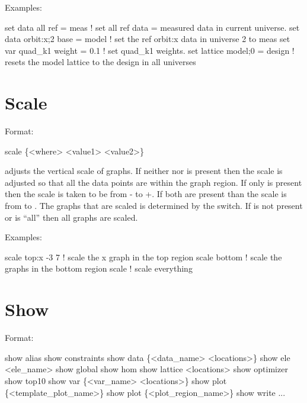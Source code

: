 Examples:
\begin{example}
  set data all ref = meas         ! set all ref data = measured data in current universe.
  set data orbit:x;2 base = model ! set the ref orbit:x data in universe 2 to meas
  set var quad\_k1 weight = 0.1   ! set quad\_k1 weights. 
  set lattice model;0 = design    ! resets the model lattice to the design in all universes
\end{example}

\section{Scale}
\label{s:scale}

Format:
\begin{example}
  scale \{<where> <value1> <value2>\}
\end{example}

\vskip 0.2in 
 adjusts the vertical scale of graphs. If neither
 nor  is present then the scale is adjusted
so that all the data points are within the graph region.  If only
 is present then the scale is taken to be from
- to +. If both are present than the scale
is from  to .  The graphs that are scaled is
determined by the  switch. If  is not present
or  is ``all'' then all graphs are scaled.

Examples:
\begin{example}
  scale top:x -3  7  ! scale the x graph in the top region
  scale bottom       ! scale the graphs in the bottom region
  scale              ! scale everything
\end{example}


\section{Show}
\label{s:show}

Format:
\begin{example}
  show alias                     
  show constraints
  show data \{<data_name> <locations>\} 
  show ele <ele_name>
  show global
  show hom
  show lattice <locations>
  show optimizer
  show top10
  show var \{<var_name> <locations>\}
  show plot \{<template_plot_name>\}
  show plot \{<plot_region_name>\}
  show write ...
\end{example}

